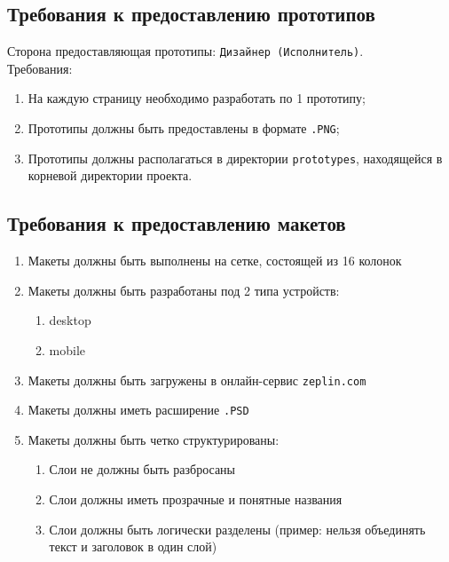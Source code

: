 \subsection{Требования к предоставлению прототипов}
Сторона предоставляющая прототипы: \texttt{Дизайнер (Исполнитель)}.\\
Требования:
\begin{enumerate}
  \item На каждую страницу необходимо разработать по 1 прототипу;
  \item Прототипы должны быть предоставлены в формате \texttt{.PNG};
  \item Прототипы должны располагаться в директории \texttt{prototypes}, находящейся в корневой директории проекта.
\end{enumerate}

\subsection{Требования к предоставлению макетов }
\begin{enumerate}
  \item Макеты должны быть выполнены на сетке, состоящей из 16 колонок
  \item Макеты должны быть разработаны под 2 типа устройств:\\
  \begin{enumerate}
    \item desktop
    \item mobile
  \end{enumerate}
  \item Макеты должны быть загружены в онлайн-сервис \texttt{zeplin.com}
  \item Макеты должны иметь расширение \texttt{.PSD}
  \item Макеты должны быть четко структурированы:
  \begin{enumerate}
    \item Слои не должны быть разбросаны
    \item Слои должны иметь прозрачные и понятные названия
    \item Слои должны быть логически разделены (пример: нельзя объединять текст и заголовок в один слой)
  \end{enumerate}
\end{enumerate}
